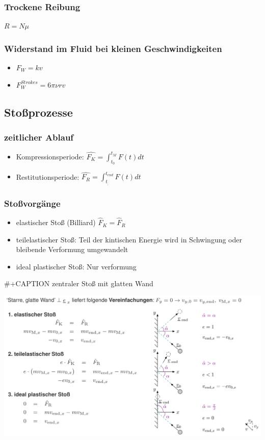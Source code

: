 \documentclass[11pt]{article}
\begin{document}
\subsubsection{Trockene Reibung}
\label{sec:org1f9ad0c}
\(R = N\mu\)
\subsubsection{Widerstand im Fluid bei kleinen Geschwindigkeiten}
\label{sec:org15f7448}
\begin{itemize}
\item \(F_W = kv\)
\item \(F_W^{Strokes} = 6\pi\nu rv\)
\end{itemize}

\subsection{Stoßprozesse}
\label{sec:orgf57e776}
\subsubsection{zeitlicher Ablauf}
\label{sec:orgb6ed109}
\begin{itemize}
\item Kompressionsperiode: \(\hat{F_K} = \int_{t_0}^{t_M} F(t)dt\)
\item Restitutionsperiode: \(\hat{F_R} = \int_{t_;}^{t_{end}} F(t)dt\)
\end{itemize}

\subsubsection{Stoßvorgänge}
\label{sec:org8b96a52}
\begin{itemize}
\item elastischer Stoß (Billiard) \(\hat{F}_K = \hat{F}_R\)
\item teilelastischer Stoß: Teil der kintischen Energie wird in Schwingung oder bleibende Verformung umgewandelt
\item ideal plastischer Stoß: Nur verformung
\end{itemize}

\#+CAPTION zentraler Stoß mit glatten Wand
\begin{center}
\includegraphics[width=.9\linewidth]{./img/stoßvorgänge.png}
\end{center}
\end{document}

